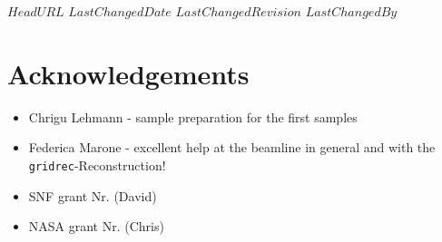 \svnidlong
{$HeadURL$}
{$LastChangedDate$}
{$LastChangedRevision$}
{$LastChangedBy$}
\section{Acknowledgements}
\begin{itemize}
	\item Chrigu Lehmann - sample preparation for the first samples
	\item Federica Marone - excellent help at the beamline in general and with the \verb+gridrec+-Reconstruction!
	\item SNF grant Nr. (David)
	\item NASA grant Nr. (Chris)
\end{itemize}
